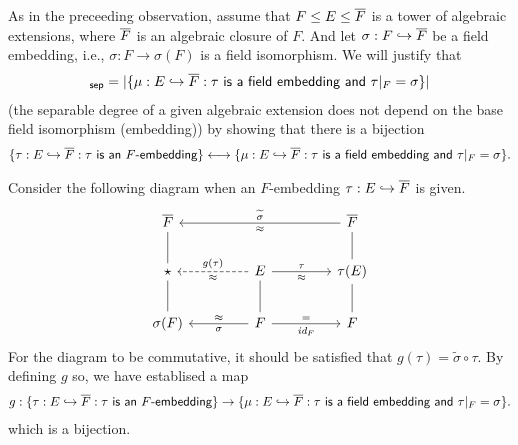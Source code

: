 \begin{obs}
    As in the preceeding observation, assume that $F\leq E\leq \overline{F}$ is a tower of algebraic extensions, where $\overline{F}$ is an algebraic closure of $F$.
    And let $\sigma: F\hookrightarrow\overline{F}$ be a field embedding, i.e., $\sigma: F\rightarrow \sigma(F)$ is a field isomorphism.
    We will justify that
    \begin{align*}
        [E:F]_\sep=|\{\mu: E\hookrightarrow\ol F: \textsf{$\tau$ is a field embedding and $\tau|_F=\sigma$}\}|
    \end{align*}
    (the separable degree of a given algebraic extension does not depend on the base field isomorphism (embedding)) by showing that there is a bijection
    \begin{align*}
        \{\tau: E\hookrightarrow\overline{F}: \textsf{$\tau$ is an $F$-embedding}\}
        \longleftrightarrow
        \{\mu: E\hookrightarrow\overline{F}: \textsf{$\tau$ is a field embedding and $\tau|_F=\sigma$}\}.
    \end{align*}

    Consider the following diagram when an $F$-embedding $\tau: E\hookrightarrow\overline{F}$ is given.
    \begin{equation*}
    \begin{tikzcd}[row sep=0.7cm, column sep=1.5cm]
        \ol F
        &
        &
        \ol F
            \arrow[ll, "\widetilde{\sigma}"', "\approx"]
        \\
        \star
            \arrow[u, dash]
        &
        E
            \arrow[l, "g(\tau)"', "\approx", dashed]
            \arrow[r, "\tau", "\approx"']
        &
        \tau(E)
            \arrow[u, dash]
        \\
        \sigma(F)
            \arrow[u, dash]
        &
        F
            \arrow[l, "\sigma", "\approx"']
            \arrow[u, dash]
            \arrow[r, "\id{F}"', "="]
        &
        F
            \arrow[u, dash]
    \end{tikzcd}
    \end{equation*}
    For the diagram to be commutative, it should be satisfied that $g(\tau)=\widetilde{\sigma}\circ\tau$.
    By defining $g$ so, we have establised a map
    \begin{align*}
        g:
        \{\tau: E\hookrightarrow\overline{F}: \textsf{$\tau$ is an $F$-embedding}\}
        \rightarrow
        \{\mu: E\hookrightarrow\overline{F}: \textsf{$\tau$ is a field embedding and $\tau|_F=\sigma$}\}.
    \end{align*}
    \color{brown}which is a bijection\color{black}.
\end{obs}

